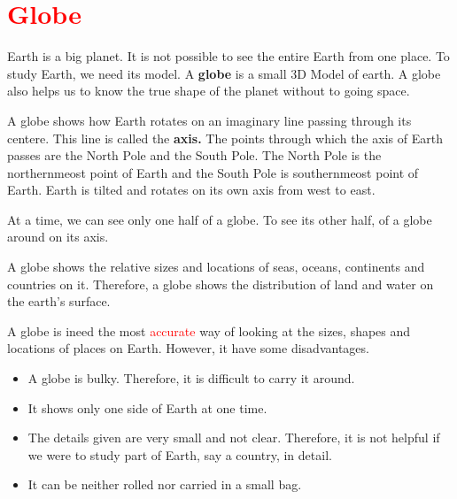 \section{\textcolor{red}{Globe}}
Earth is a big planet. It is not possible to see the entire Earth from one place. To study Earth, we need its model. A \textbf{globe} is a small 3D Model of earth. A globe also helps us to know the true shape of the planet without to going space.
\vspace{0.1in}
\par
A globe shows how Earth rotates on an imaginary line passing through its centere. This line is called the \textbf{axis.} The points through which the axis of Earth passes are the North Pole and the South Pole. The North Pole is the northernmeost point of Earth and the South Pole is southernmeost point of Earth. Earth is tilted and rotates on its own axis from west to east.
\vspace{0.4in}
\par
At a time, we can see only one half of a globe. To see its other half, of a globe around on its axis.
\vspace{0.1in}
\par
A globe shows the relative sizes and locations of seas, oceans, continents and countries on it. Therefore, a globe shows the distribution of land and water on the earth’s surface.
\vspace{0.1in}
\par
A globe is ineed the most \textcolor{red}{accurate} way of looking at the sizes, shapes and locations of places on Earth. However, it have some disadvantages.
\begin{itemize}
    \item A globe is bulky. Therefore, it is difficult to carry it around.
    \item It shows only one side of Earth at one time.
    \item The details given are very small and not clear. Therefore, it is not helpful if we were to study part of Earth, say a country, in detail.
    \item It can be neither rolled nor carried in a small bag.
\end{itemize}
